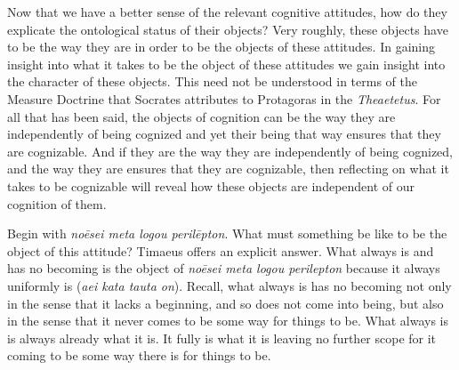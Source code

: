 Now that we have a better sense of the relevant cognitive attitudes, how do they explicate the ontological status of their objects? Very roughly, these objects have to be the way they are in order to be the objects of these attitudes. In gaining insight into what it takes to be the object of these attitudes we gain insight into the character of these objects. This need not be understood in terms of the Measure Doctrine that Socrates attributes to Protagoras in the \emph{Theaetetus}. For all that has been said, the objects of cognition can be the way they are independently of being cognized and yet their being that way ensures that they are cognizable. And if they are the way they are independently of being cognized, and the way they are ensures that they are cognizable, then reflecting on what it takes to be cognizable will reveal how these objects are independent of our cognition of them.

Begin with \emph{noēsei meta logou perilēpton}. What must something be like to be the object of this attitude? Timaeus offers an explicit answer. What always is and has no becoming is the object of \emph{noēsei meta logou perilepton} because it always uniformly is (\emph{aei kata tauta on}). Recall, what always is has no becoming not only in the sense that it lacks a beginning, and so does not come into being, but also in the sense that it never comes to be some way for things to be. What always is is always already what it is. It fully is what it is leaving no further scope for it coming to be some way there is for things to be. 

